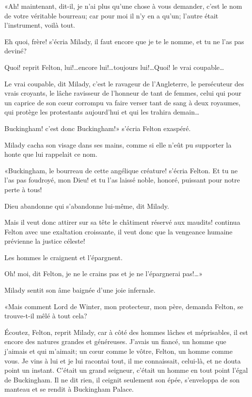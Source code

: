 «Ah! maintenant, dit-il, je n'ai plus qu'une chose à vous demander, c'est le nom de votre véritable bourreau; car pour moi il n'y en a qu'un; l'autre était l'instrument, voilà tout. 

\speak  Eh quoi, frère! s'écria Milady, il faut encore que je te le nomme, et tu ne l'as pas deviné? 

\speak  Quoi! reprit Felton, lui!\dots encore lui!\dots toujours lui!\dots Quoi! le vrai coupable\dots 

\speak  Le vrai coupable, dit Milady, c'est le ravageur de l'Angleterre, le persécuteur des vrais croyants, le lâche ravisseur de l'honneur de tant de femmes, celui qui pour un caprice de son cœur corrompu va faire verser tant de sang à deux royaumes, qui protège les protestants aujourd'hui et qui les trahira demain\dots 

\speak  Buckingham! c'est donc Buckingham!» s'écria Felton exaspéré. 

Milady cacha son visage dans ses mains, comme si elle n'eût pu supporter la honte que lui rappelait ce nom. 

«Buckingham, le bourreau de cette angélique créature! s'écria Felton. Et tu ne l'as pas foudroyé, mon Dieu! et tu l'as laissé noble, honoré, puissant pour notre perte à tous! 

\speak  Dieu abandonne qui s'abandonne lui-même, dit Milady. 

\speak  Mais il veut donc attirer sur sa tête le châtiment réservé aux maudits! continua Felton avec une exaltation croissante, il veut donc que la vengeance humaine prévienne la justice céleste! 

\speak  Les hommes le craignent et l'épargnent. 

\speak  Oh! moi, dit Felton, je ne le crains pas et je ne l'épargnerai pas!\dots» 

Milady sentit son âme baignée d'une joie infernale. 

«Mais comment Lord de Winter, mon protecteur, mon père, demanda Felton, se trouve-t-il mêlé à tout cela? 

\speak  Écoutez, Felton, reprit Milady, car à côté des hommes lâches et méprisables, il est encore des natures grandes et généreuses. J'avais un fiancé, un homme que j'aimais et qui m'aimait; un cœur comme le vôtre, Felton, un homme comme vous. Je vins à lui et je lui racontai tout, il me connaissait, celui-là, et ne douta point un instant. C'était un grand seigneur, c'était un homme en tout point l'égal de Buckingham. Il ne dit rien, il ceignit seulement son épée, s'enveloppa de son manteau et se rendit à Buckingham Palace. 

